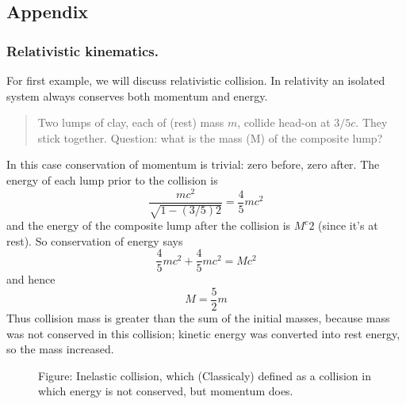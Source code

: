 \documentclass[../../../main.tex]{subfiles}
\begin{document}
\subsection{Appendix}
\subsubsection{Relativistic kinematics.} For first example, we will discuss relativistic collision. In relativity an isolated system always conserves both momentum and energy. 
\begin{quote}
    Two lumps of clay, each of (rest) mass $m$, collide head-on at $3/5 c$. They stick together. Question: what is the mass (M) of the composite lump?
\end{quote}
In this case conservation of momentum is trivial: zero before, zero after. The energy of each lump prior to the collision is
\begin{equation*}
    \frac{mc^2}{\sqrt{1 - (3/5)2}}=\frac{4}{5}mc^2
\end{equation*}
and the energy of the composite lump after the collision is $M^c2$ (since it's at rest). So conservation of energy says
\begin{equation*}
    \frac{4}{5}mc^2+\frac{4}{5}mc^2=Mc^2
\end{equation*}
and hence
\begin{equation*}
    M=\frac{5}{2}m
\end{equation*}
Thus collision mass is greater than the sum of the initial masses, because mass was not conserved in this collision; kinetic energy was converted into rest energy, so the mass increased.
\begin{figure}[b]
    \centering
    \caption*{Figure: Inelastic collision, which (Classicaly) defined as a collision in which energy is not conserved, but momentum does.}
\end{figure}
\end{document}
